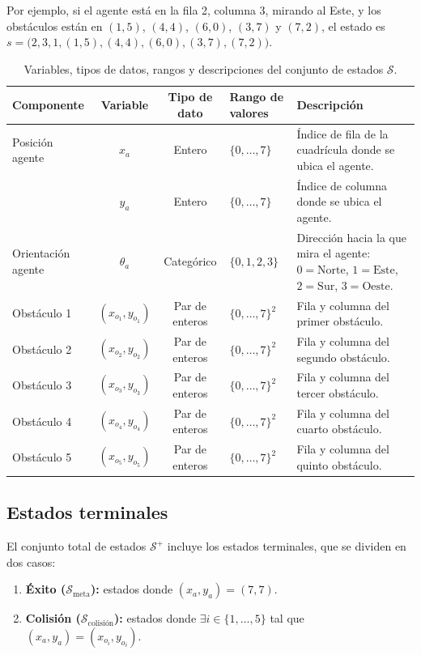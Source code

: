 \documentclass[11pt,a4paper]{article}
\begin{document}
Por ejemplo, si el agente está en la fila 2, columna 3, mirando al Este, y los obstáculos están en $(1,5)$, $(4,4)$, $(6,0)$, $(3,7)$ y $(7,2)$, el estado es $s = \big(2, 3, 1, (1,5), (4,4), (6,0), (3,7), (7,2)\big)$.

\begin{table}[h!]
\centering
\small
\renewcommand{\arraystretch}{1.2}
\caption{Variables, tipos de datos, rangos y descripciones del conjunto de estados $\mathcal{S}$.}
\vspace{0.2cm}
\begin{tabularx}{\textwidth}{@{}>{\raggedright\arraybackslash}p{2.1cm}cc>{\centering\arraybackslash}p{3.0cm}>{\raggedright\arraybackslash}X@{}}
\toprule
\textbf{Componente} & \textbf{Variable} & \textbf{Tipo de dato} & \textbf{Rango de valores} & \textbf{Descripción} \\ \midrule
Posición agente & $x_a$ & Entero & $\{0, \dots, 7\}$ & Índice de fila de la cuadrícula donde se ubica el agente. \\
& $y_a$ & Entero & $\{0, \dots, 7\}$ & Índice de columna donde se ubica el agente. \\ \midrule
Orientación agente & $\theta_a$ & Categórico & $\{0, 1, 2, 3\}$ & Dirección hacia la que mira el agente: $0=\text{Norte}$, $1=\text{Este}$, $2=\text{Sur}$, $3=\text{Oeste}$. \\ \midrule
Obstáculo 1 & $(x_{o_1}, y_{o_1})$ & Par de enteros & $\{0, \dots, 7\}^2$ & Fila y columna del primer obstáculo. \\
Obstáculo 2 & $(x_{o_2}, y_{o_2})$ & Par de enteros & $\{0, \dots, 7\}^2$ & Fila y columna del segundo obstáculo. \\
Obstáculo 3 & $(x_{o_3}, y_{o_3})$ & Par de enteros & $\{0, \dots, 7\}^2$ & Fila y columna del tercer obstáculo. \\
Obstáculo 4 & $(x_{o_4}, y_{o_4})$ & Par de enteros & $\{0, \dots, 7\}^2$ & Fila y columna del cuarto obstáculo. \\
Obstáculo 5 & $(x_{o_5}, y_{o_5})$ & Par de enteros & $\{0, \dots, 7\}^2$ & Fila y columna del quinto obstáculo. \\ \bottomrule
\end{tabularx}
\end{table}

\subsection{Estados terminales}
El conjunto total de estados $\mathcal{S}^+$ incluye los estados terminales, que se dividen en dos casos:
\begin{enumerate}[leftmargin=1.2cm]
    \item \textbf{Éxito ($\mathcal{S}_{\text{meta}}$):} estados donde $(x_a, y_a) = (7, 7)$.
    \item \textbf{Colisión ($\mathcal{S}_{\text{colisión}}$):} estados donde $\exists i \in \{1, \dots, 5\}$ tal que $(x_a, y_a) = (x_{o_i}, y_{o_i})$.
\end{enumerate}
\end{document}
